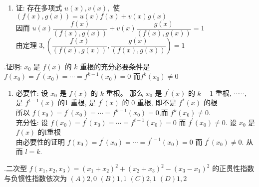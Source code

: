 \documentclass{article}
\begin{document}
\begin{enumerate}[\qquad 证：]
    \item 证: 存在多项式 $u(x), v(x),$ 使 $(f(x), g(x))=u(x) f(x)+v(x) g(x)$ \\
          \vspace{1ex}
          因而 $u(x) \dfrac{f(x)}{(f(x), g(x))}+v(x) \dfrac{g(x)}{(f(x), g(x))}=1$ \\
          \vspace{1ex}
          由定理 $3, \left(\dfrac{f(x)}{(f(x),g(x))},\dfrac{g(x)}{(f(x), g(x))}\right)=1$
\end{enumerate}

\vspace{1ex}
{.}证明: $x_{0}$ 是 $f(x)$ 的 $k$ 重根的充分必要条件是 $f\left(x_{0}\right)=f^{\prime}\left(x_{0}\right)=\cdots=f^{k-1}\left(x_{0}\right)=0$ 而$f^{k}\left(x_{0}\right) \neq 0$

\begin{enumerate}[\qquad 证：]
    \item {\heiti 必要性:} 设 $x_{0}$ 是 $f(x)$ 的 $k$ 重根。 那么 $x_{0}$ 是 $f^{\prime}(x)$ 的 $k-1$ 重根, $\cdots \cdots$, 是 $f^{t-1}(x)$ 的1 重根, 是 $f^{\prime}(x)$ 的 0 重根, 即不是 $f^{*}(x)$ 的根 \\
          所以 $f\left(x_{0}\right)=f^{\prime}\left(x_{0}\right)=\cdots=f^{k-1}\left(x_{0}\right)=0$,而 $f^{k}\left(x_{0}\right) \neq 0 .$ \\
          {\heiti 充分性: } 设 $f(x_{0})=f^{\prime}\left(x_{0}\right)=\cdots=f^{t-1}\left(x_{0}\right)=0$ 而 $f^{\prime}\left(x_{0}\right) \neq 0 .$ 设 $x_{0}$ 是 $f(x)$ 的l重根 \\
          由必要性的证明 $f\left(x_{0}\right)=f^{\prime}\left(x_{0}\right)=\cdots=f^{\prime-1}\left(x_{0}\right)=0$ 而 $f^{\prime}\left(x_{0}\right) \neq 0 .$ 从而 $l=k .$
\end{enumerate}

\vspace{1ex}
{.}二次型 $f\left(x_{1}, x_{2}, x_{3}\right)=\left(x_{1}+x_{2}\right)^{2}+\left(x_{2}+x_{3}\right)^{2}-\left(x_{3}-x_{1}\right)^{2}$ 的正贯性指数与负惯性指数依次为
$(A) 2,0 $ $(B) 1,1 $ $(C) 2,1 $ $(D) 1,2 $
\end{document}
